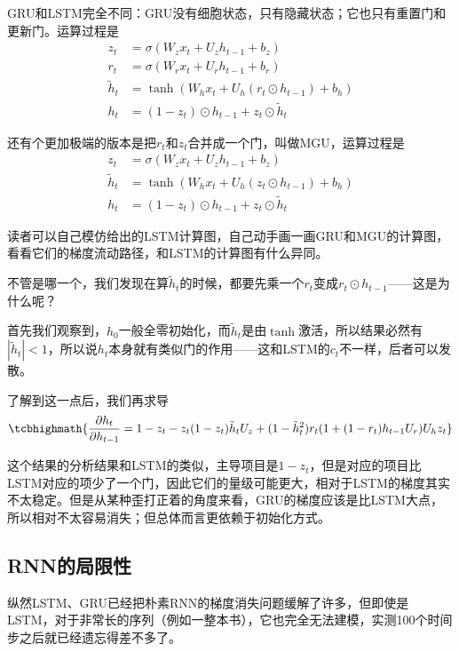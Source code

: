 GRU和LSTM完全不同：GRU没有细胞状态，只有隐藏状态；它也只有重置门和更新门。运算过程是\cite{chung2014empiricalevaluationgatedrecurrent}
\begin{align}
    z_t &= \sigma(W_z x_t + U_z h_{t-1} + b_z) \\
    r_t &= \sigma(W_r x_t + U_r h_{t-1} + b_r) \\
    \tilde{h}_t &= \tanh(W_h x_t + U_h (r_t \odot h_{t-1}) + b_h) \\
    h_t &= (1 - z_t) \odot h_{t-1} + z_t \odot \tilde{h}_t
\end{align}

还有个更加极端的版本是把$r_t$和$z_t$合并成一个门，叫做MGU\cite{zhou2016minimalgatedunitrecurrent}，运算过程是
\begin{align}
    z_t &= \sigma(W_z x_t + U_z h_{t-1} + b_z) \\
    \tilde{h}_t &= \tanh(W_h x_t + U_h (z_t \odot h_{t-1}) + b_h) \\
    h_t &= (1 - z_t) \odot h_{t-1} + z_t \odot \tilde{h}_t
\end{align}

读者可以自己模仿给出的LSTM计算图，自己动手画一画GRU和MGU的计算图，看看它们的梯度流动路径，和LSTM的计算图有什么异同。

不管是哪一个，我们发现在算$\tilde{h}_t$的时候，都要先乘一个$r_t$变成$r_t \odot h_{t-1}$——这是为什么呢？

首先我们观察到，$h_0$一般全零初始化，而$\tilde{h}_t$是由$\tanh$激活，所以结果必然有$|\tilde{h}_t| < 1$，所以说$h_t$本身就有类似门的作用——这和LSTM的$c_t$不一样，后者可以发散。

了解到这一点后，我们再求导
\begin{equation}
    \tcbhighmath{
\frac{\partial h_t}{\partial h_{t-1}} = 1 - z_t - z_t(1-z_t)\tilde{h}_tU_z + (1-\tilde{h}_t^2)r_t(1+(1-r_t)h_{t-1}U_r)U_hz_t}
\end{equation}

这个结果的分析结果和LSTM的类似，主导项目是$1 - z_t$，但是对应的项目比LSTM对应的项少了一个门，因此它们的量级可能更大，相对于LSTM的梯度其实不太稳定。但是从某种歪打正着的角度来看，GRU的梯度应该是比LSTM大点，所以相对不太容易消失；但总体而言更依赖于初始化方式。

\subsection{RNN的局限性}

纵然LSTM、GRU已经把朴素RNN的梯度消失问题缓解了许多，但即使是LSTM，对于非常长的序列（例如一整本书），它也完全无法建模，实测100个时间步之后就已经遗忘得差不多了。

